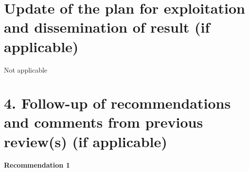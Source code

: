 \documentclass{deliverablereport}
\makeatletter
\renewcommand\subsubsection{\@startsection{subsubsection}{2}%
  \z@{.5\linespacing\@plus.7\linespacing}{.1\linespacing}%
  {\normalfont\bfseries}}
\makeatother
\begin{document}








  \section{Update of the plan for exploitation and dissemination of result (if
    applicable)}
 Not applicable



  \section{4. Follow-up of recommendations and comments from previous review(s) (if
    applicable)}
  
\paragraph{Recommendation 1}
\end{document}
